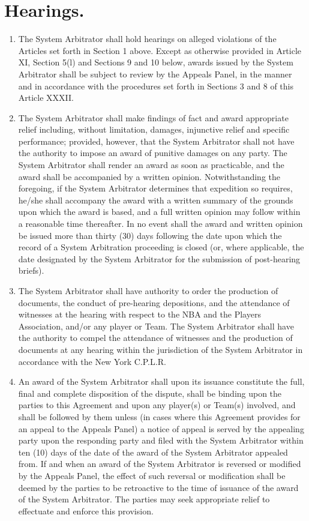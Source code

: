 \documentclass[
]{book}
\providecommand{\tightlist}{%
  \setlength{\itemsep}{0pt}\setlength{\parskip}{0pt}}
\begin{document}
\hypertarget{hearings.-1}{%
\section{Hearings.}\label{hearings.-1}}

\begin{enumerate}
\def\labelenumi{(\alph{enumi})}
\tightlist
\item
  The System Arbitrator shall hold hearings on alleged violations of the Articles set forth in Section 1 above. Except as otherwise provided in Article XI, Section 5(l) and Sections 9 and 10 below, awards issued by the System Arbitrator shall be subject to review by the Appeals Panel, in the manner and in accordance with the procedures set forth in Sections 3 and 8 of this Article XXXII.
\item
  The System Arbitrator shall make findings of fact and award appropriate relief including, without limitation, damages, injunctive relief and specific performance; provided, however, that the System Arbitrator shall not have the authority to impose an award of punitive damages on any party. The System Arbitrator shall render an award as soon as practicable, and the award shall be accompanied by a written opinion. Notwithstanding the foregoing, if the System Arbitrator determines that expedition so requires, he/she shall accompany the award with a written summary of the grounds upon which the award is based, and a full written opinion may follow within a reasonable time thereafter. In no event shall the award and written opinion be issued more than thirty (30) days following the date upon which the record of a System Arbitration proceeding is closed (or, where applicable, the date designated by the System Arbitrator for the submission of post-hearing briefs).
\item
  The System Arbitrator shall have authority to order the production of documents, the conduct of pre-hearing depositions, and the attendance of witnesses at the hearing with respect to the NBA and the Players Association, and/or any player or Team. The System Arbitrator shall have the authority to compel the attendance of witnesses and the production of documents at any hearing within the jurisdiction of the System Arbitrator in accordance with the New York C.P.L.R.
\item
  An award of the System Arbitrator shall upon its issuance constitute the full, final and complete disposition of the dispute, shall be binding upon the parties to this Agreement and upon any player(s) or Team(s) involved, and shall be followed by them unless (in cases where this Agreement provides for an appeal to the Appeals Panel) a notice of appeal is served by the appealing party upon the responding party and filed with the System Arbitrator within ten (10) days of the date of the award of the System Arbitrator appealed from. If and when an award of the System Arbitrator is reversed or modified by the Appeals Panel, the effect of such reversal or modification shall be deemed by the parties to be retroactive to the time of issuance of the award of the System Arbitrator. The parties may seek appropriate relief to effectuate and enforce this provision.

\end{enumerate}
\end{document}
